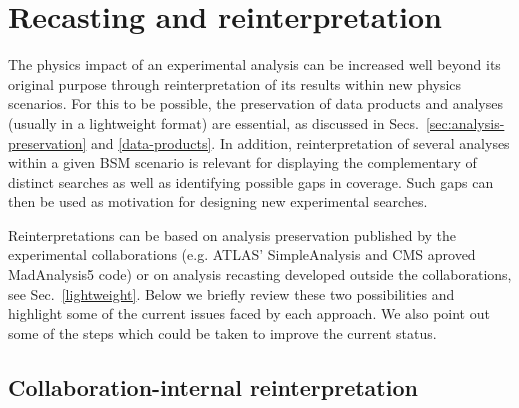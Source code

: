 \documentclass[11pt]{article}
\begin{document}



\section{Recasting and reinterpretation}
\label{reinterpret}

The physics impact of an experimental analysis can be increased well beyond its original purpose through reinterpretation of its results within new physics scenarios.
For this to be possible, the preservation of data products and analyses (usually in a lightweight format) are essential, as discussed in Secs.~\ref{sec:analysis-preservation} and \ref{data-products}.
In addition, reinterpretation of several analyses within a given BSM scenario is relevant for displaying the complementary of distinct searches as well as identifying possible gaps in coverage.
Such gaps can then be used as motivation for designing new experimental searches.


Reinterpretations can be based on analysis preservation published by the experimental collaborations (e.g. ATLAS' SimpleAnalysis and CMS aproved MadAnalysis5 code) or on analysis recasting developed outside the collaborations, see Sec.~\ref{lightweight}. Below we briefly review these two possibilities and highlight some of the current issues faced by each approach.
We also point out some of the steps which could be taken to improve the current status.



\subsection{Collaboration-internal  reinterpretation}
\end{document}
